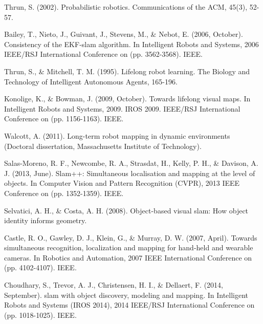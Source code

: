 \documentclass[]{article}
\begin{document}
    \begin{thebibliography}{99} %

            \newblock Thrun, S. (2002). Probabilistic robotics. Communications of the ACM, 45(3), 52-57.


         \newblock Bailey, T., Nieto, J., Guivant, J., Stevens, M., \& Nebot, E. (2006, October). Consistency of the EKF-slam algorithm. In Intelligent Robots and Systems, 2006 IEEE/RSJ International Conference on (pp. 3562-3568). IEEE.  

            \newblock Thrun, S., \& Mitchell, T. M. (1995). Lifelong robot learning. The Biology and Technology of Intelligent Autonomous Agents, 165-196.

            \newblock Konolige, K., \& Bowman, J. (2009, October). Towards lifelong visual maps. In Intelligent Robots and Systems, 2009. IROS 2009. IEEE/RSJ International Conference on (pp. 1156-1163). IEEE.

            \newblock Walcott, A. (2011). Long-term robot mapping in dynamic environments (Doctoral dissertation, Massachusetts Institute of Technology).




            \newblock Salas-Moreno, R. F., Newcombe, R. A., Strasdat, H., Kelly, P. H., \& Davison, A. J. (2013, June). Slam++: Simultaneous localisation and mapping at the level of objects. In Computer Vision and Pattern Recognition (CVPR), 2013 IEEE Conference on (pp. 1352-1359). IEEE.

            \newblock Selvatici, A. H., \& Costa, A. H. (2008). Object-based visual slam: How object identity informs geometry.

            \newblock Castle, R. O., Gawley, D. J., Klein, G., \& Murray, D. W. (2007, April). Towards simultaneous recognition, localization and mapping for hand-held and wearable cameras. In Robotics and Automation, 2007 IEEE International Conference on (pp. 4102-4107). IEEE.


            \newblock Choudhary, S., Trevor, A. J., Christensen, H. I., \& Dellaert, F. (2014, September). slam with object discovery, modeling and mapping. In Intelligent Robots and Systems (IROS 2014), 2014 IEEE/RSJ International Conference on (pp. 1018-1025). IEEE.


\end{thebibliography}
\end{document}

